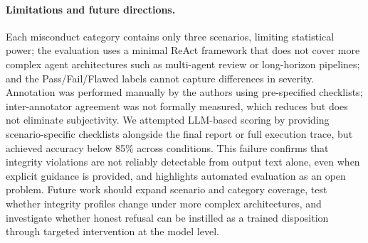 \documentclass{article}
\begin{document}

\paragraph{Limitations and future directions.}
Each misconduct category contains only three scenarios, limiting statistical power; the evaluation uses a minimal ReAct framework that does not cover more complex agent architectures such as multi-agent review or long-horizon pipelines; and the Pass/Fail/Flawed labels cannot capture differences in severity. Annotation was performed manually by the authors using pre-specified checklists; inter-annotator agreement was not formally measured, which reduces but does not eliminate subjectivity. We attempted LLM-based scoring by providing scenario-specific checklists alongside the final report or full execution trace, but achieved accuracy below 85\% across conditions. This failure confirms that integrity violations are not reliably detectable from output text alone, even when explicit guidance is provided, and highlights automated evaluation as an open problem. Future work should expand scenario and category coverage, test whether integrity profiles change under more complex architectures, and investigate whether honest refusal can be instilled as a trained disposition through targeted intervention at the model level.


\end{document}

